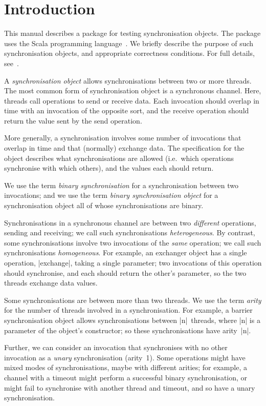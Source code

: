 
\section{Introduction}

This manual describes a package for testing synchronisation objects.  The
package uses the Scala programming language~\cite{programming-in-Scala}.  We
briefly describe the purpose of such synchronisation objects, and appropriate
correctness conditions.  For full details, see~\cite{sync}.  

A \emph{synchronisation object} allows synchronisations between two or more
threads.  The most common form of synchronisation object is a synchronous
channel.  Here, threads call operations to send or receive data.  Each
invocation should overlap in time with an invocation of the opposite sort, and
the receive operation should return the value sent by the send operation.

More generally, a synchronisation involves some number of invocations that
overlap in time and that (normally) exchange data.  The specification for the
object describes what synchronisations are allowed (i.e.~which operations
synchronise with which others), and the values each should return. 

We use the term \emph{binary synchronisation} for a synchronisation between
two invocations; and we use the term \emph{binary synchronisation object} for
a synchronisation object all of whose synchronisations are binary. 

Synchronisations in a synchronous channel are between two \emph{different}
operations, sending and receiving; we call such synchronisations
\emph{heterogeneous}.  By contrast, some synchronisations involve two
invocations of the \emph{same} operation; we call such synchronisations
\emph{homogeneous}.  For example, an exchanger object has a single operation,
|exchange|, taking a single parameter; two invocations of this operation
should synchronise, and each should return the other's parameter, so the two
threads exchange data values.

Some synchronisations are between more than two threads.  We use the term
\emph{arity} for the number of threads involved in a synchronisation.  For
example, a barrier synchronisation object allows synchronisations between
|n|~threads, where |n| is a parameter of the object's constructor; so these
synchronisations have arity~|n|.  

Further, we can consider an invocation that synchronises with no other
invocation as a \emph{unary} synchronisation (arity~1).  Some operations might
have mixed modes of synchronisations, maybe with different arities; for
example, a channel with a timeout might perform a successful binary
synchronisation, or might fail to synchronise with another thread and timeout,
and so have a unary synchronisation.

